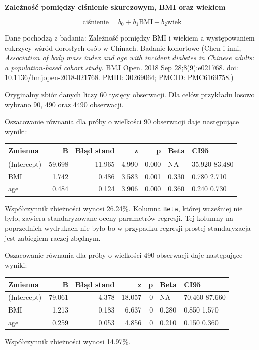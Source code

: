 \documentclass[
  openany]{book}
\begin{document}
\begin{example}
\textbf{Zależność pomiędzy ciśnienie skurczowym, BMI oraz wiekiem}

\[\textrm{ciśnienie} = b_0 + b_1 \textrm{BMI} + b_2\textrm{wiek}\]

Dane pochodzą z badania: Zależność pomiędzy BMI i wiekiem a występowaniem cukrzycy
wśród dorosłych osób w Chinach. Badanie kohortowe (Chen i inni, \emph{Association of body mass index
and age with incident diabetes in Chinese adults: a population-based cohort study.}
BMJ Open. 2018 Sep 28;8(9):e021768. doi: 10.1136/bmjopen-2018-021768. PMID: 30269064; PMCID: PMC6169758.)

Oryginalny zbiór danych liczy 60 tysięcy obserwacji. Dla celów przykładu losowo wybrano 90, 490
oraz 4490 obserwacji.

Oszacowanie równania dla próby o wielkości 90 obserwacji daje następujące wyniki:

\begin{tabular}{l|r|r|r|r|l|l}
\hline
Zmienna & B & Błąd stand & z & p & Beta & CI95\\
\hline
(Intercept) & 59.698 & 11.965 & 4.990 & 0.000 & NA & 35.920 83.480\\
\hline
BMI & 1.742 & 0.486 & 3.583 & 0.001 & 0.330 & 0.780 2.710\\
\hline
age & 0.484 & 0.124 & 3.906 & 0.000 & 0.360 & 0.240 0.730\\
\hline
\end{tabular}

Współczynnik zbieżności wynosi 26.24\%.
Kolumna \texttt{Beta}, której wcześniej nie było, zawiera standaryzowane
oceny parametrów regresji. Tej kolumny na poprzednich wydrukach nie było
bo w przypadku regresji
prostej standaryzacja jest zabiegiem raczej zbędnym.

Oszacowanie równania dla próby o wielkości 490 obserwacji daje następujące
wyniki:

\begin{tabular}{l|r|r|r|r|l|l}
\hline
Zmienna & B & Błąd stand & z & p & Beta & CI95\\
\hline
(Intercept) & 79.061 & 4.378 & 18.057 & 0 & NA & 70.460 87.660\\
\hline
BMI & 1.213 & 0.183 & 6.637 & 0 & 0.280 & 0.850 1.570\\
\hline
age & 0.259 & 0.053 & 4.856 & 0 & 0.210 & 0.150 0.360\\
\hline
\end{tabular}

Współczynnik zbieżności wynosi 14.97\%.


\end{example}
\end{document}
